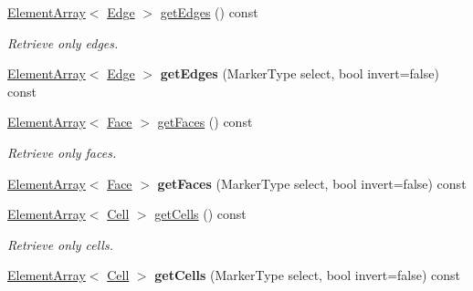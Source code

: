 \begin{DoxyCompactItemize}
\item 
\hypertarget{classINMOST_1_1ElementSet_a89ac64c67135a46eed6475b84fe330a8}{\hyperlink{classINMOST_1_1ElementArray}{Element\-Array}$<$ \hyperlink{classINMOST_1_1Edge}{Edge} $>$ \hyperlink{classINMOST_1_1ElementSet_a89ac64c67135a46eed6475b84fe330a8}{get\-Edges} () const }\label{classINMOST_1_1ElementSet_a89ac64c67135a46eed6475b84fe330a8}

\begin{DoxyCompactList}\small\item\em Retrieve only edges. \end{DoxyCompactList}\item 
\hypertarget{classINMOST_1_1ElementSet_a723be5f10c80cec2290858117a617d75}{\hyperlink{classINMOST_1_1ElementArray}{Element\-Array}$<$ \hyperlink{classINMOST_1_1Edge}{Edge} $>$ {\bfseries get\-Edges} (Marker\-Type select, bool invert=false) const }\label{classINMOST_1_1ElementSet_a723be5f10c80cec2290858117a617d75}

\item 
\hypertarget{classINMOST_1_1ElementSet_a7b0d595c190a82196b2bbff022ef46eb}{\hyperlink{classINMOST_1_1ElementArray}{Element\-Array}$<$ \hyperlink{classINMOST_1_1Face}{Face} $>$ \hyperlink{classINMOST_1_1ElementSet_a7b0d595c190a82196b2bbff022ef46eb}{get\-Faces} () const }\label{classINMOST_1_1ElementSet_a7b0d595c190a82196b2bbff022ef46eb}

\begin{DoxyCompactList}\small\item\em Retrieve only faces. \end{DoxyCompactList}\item 
\hypertarget{classINMOST_1_1ElementSet_a37460bc42ddabbbd2b9feefc313e9a22}{\hyperlink{classINMOST_1_1ElementArray}{Element\-Array}$<$ \hyperlink{classINMOST_1_1Face}{Face} $>$ {\bfseries get\-Faces} (Marker\-Type select, bool invert=false) const }\label{classINMOST_1_1ElementSet_a37460bc42ddabbbd2b9feefc313e9a22}

\item 
\hypertarget{classINMOST_1_1ElementSet_a1ac9b271c2ddf7ea193c1f2711f59df4}{\hyperlink{classINMOST_1_1ElementArray}{Element\-Array}$<$ \hyperlink{classINMOST_1_1Cell}{Cell} $>$ \hyperlink{classINMOST_1_1ElementSet_a1ac9b271c2ddf7ea193c1f2711f59df4}{get\-Cells} () const }\label{classINMOST_1_1ElementSet_a1ac9b271c2ddf7ea193c1f2711f59df4}

\begin{DoxyCompactList}\small\item\em Retrieve only cells. \end{DoxyCompactList}\item 
\hypertarget{classINMOST_1_1ElementSet_a2e06bd0a9d9b5ffdc04560b3cdd560eb}{\hyperlink{classINMOST_1_1ElementArray}{Element\-Array}$<$ \hyperlink{classINMOST_1_1Cell}{Cell} $>$ {\bfseries get\-Cells} (Marker\-Type select, bool invert=false) const }\label{classINMOST_1_1ElementSet_a2e06bd0a9d9b5ffdc04560b3cdd560eb}


\end{DoxyCompactItemize}
